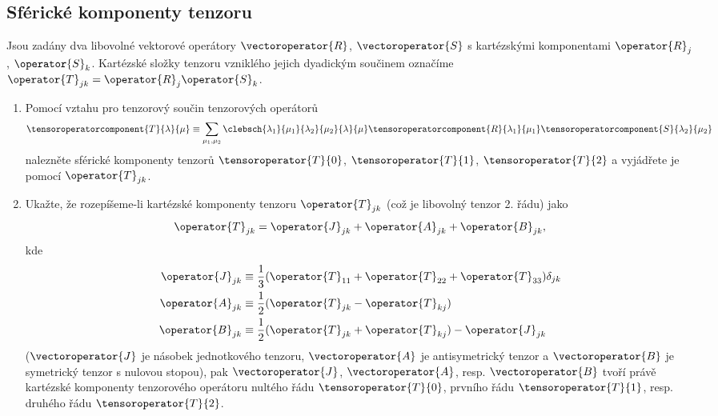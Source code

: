 \subsection{Sférické komponenty tenzoru}
\label{sec:DyadicProduct}
	Jsou zadány dva libovolné vektorové operátory $\vectoroperator{R}$, $\vectoroperator{S}$ 
	s kartézskými komponentami $\operator{R}_{j}$, $\operator{S}_{k}$.
	Kartézské složky tenzoru vzniklého jejich dyadickým součinem označíme 
	$\operator{T}_{jk}=\operator{R}_{j}\operator{S}_{k}$.

	\begin{enumerate}
	\item 
		Pomocí vztahu pro tenzorový součin tenzorových operátorů
		\begin{equation*}
			\tensoroperatorcomponent{T}{\lambda}{\mu}\equiv\sum_{\mu_{1},\mu_{2}}
				\clebsch{\lambda_{1}}{\mu_{1}}{\lambda_{2}}{\mu_{2}}{\lambda}{\mu}
				\tensoroperatorcomponent{R}{\lambda_{1}}{\mu_{1}}\tensoroperatorcomponent{S}{\lambda_{2}}{\mu_{2}}
		\end{equation*}
		nalezněte sférické komponenty tenzorů $\tensoroperator{T}{0}$, $\tensoroperator{T}{1}$, $\tensoroperator{T}{2}$ 
		a vyjádřete je pomocí $\operator{T}_{jk}$.

	\item
		Ukažte, že rozepíšeme-li kartézské komponenty tenzoru $\operator{T}_{jk}$ 
		(což je libovolný tenzor 2. řádu) jako
		\begin{equation*}
		\operator{T}_{jk}=\operator{J}_{jk}+\operator{A}_{jk}+\operator{B}_{jk},
		\end{equation*}
		kde
		\begin{align*}
			\operator{J}_{jk}&\equiv\frac{1}{3}(\operator{T}_{11}+\operator{T}_{22}+\operator{T}_{33})\delta_{jk}\\
			\operator{A}_{jk}&\equiv\frac{1}{2}(\operator{T}_{jk}-\operator{T}_{kj})\\
			\operator{B}_{jk}&\equiv\frac{1}{2}(\operator{T}_{jk}+\operator{T}_{kj})-\operator{J}_{jk}
		\end{align*}
		($\vectoroperator{J}$ je násobek jednotkového tenzoru, $\vectoroperator{A}$ je antisymetrický tenzor 
		a $\vectoroperator{B}$ je symetrický tenzor s nulovou stopou),
		pak $\vectoroperator{J}$, $\vectoroperator{A}$, resp. $\vectoroperator{B}$ tvoří právě kartézské komponenty 
		tenzorového operátoru nultého řádu $\tensoroperator{T}{0}$, prvního řádu $\tensoroperator{T}{1}$, 
		resp. druhého řádu $\tensoroperator{T}{2}$.
	\end{enumerate}
		